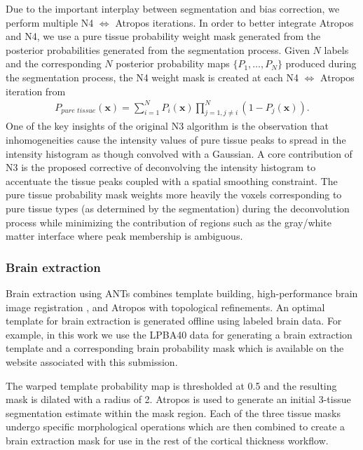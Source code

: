 Due to the important interplay between segmentation and bias correction,
we perform multiple N4 $\Leftrightarrow$ Atropos iterations.
In order to better integrate Atropos and N4, we use  
a pure tissue probability weight mask generated from the 
posterior probabilities generated from the segmentation 
process.  Given $N$ labels and the corresponding $N$
posterior probability maps $\{ P_1, \ldots, P_N\}$ produced
during the segmentation process, the N4 weight mask is 
created at each N4 $\Leftrightarrow$ Atropos iteration from
\begin{align}
  P_{pure\,\,tissue}(\mathbf{x}) = \sum_{i=1}^N P_i(\mathbf{x}) \prod_{j=1, j \neq i}^N \left( 1 - P_j(\mathbf{x}) \right).
\end{align}
One of the key insights of the original N3 algorithm is the
observation that inhomogeneities cause the intensity values of
pure tissue peaks to spread in the intensity histogram as though
convolved with a Gaussian.  A core contribution of N3 is the
proposed corrective of deconvolving the intensity histogram to 
accentuate the tissue peaks coupled with a spatial smoothing 
constraint. The pure tissue probability mask
weights more heavily the voxels corresponding to pure tissue 
types (as determined by the segmentation) during the deconvolution process 
while minimizing the contribution of regions such as the gray/white matter 
interface where peak membership is ambiguous. 

\subsubsection{Brain extraction}

Brain extraction using ANTs combines template building, high-performance
brain image registration \citep{avants2011}, and Atropos with topological refinements.  
An optimal template for brain extraction is 
generated offline using labeled brain data.  For example, in this work we use the LPBA40 data 
for generating a brain extraction template and a corresponding brain probability mask which is
available on the website associated with this submission. 

  The warped template probability map is thresholded at 0.5 and the resulting mask is dilated
with a radius of 2.  Atropos is used to generate an initial 3-tissue segmentation estimate within the mask
region.  Each of the three tissue masks undergo specific morphological operations which are then
combined to create a brain extraction mask for use in the rest of the
cortical thickness workflow.  

